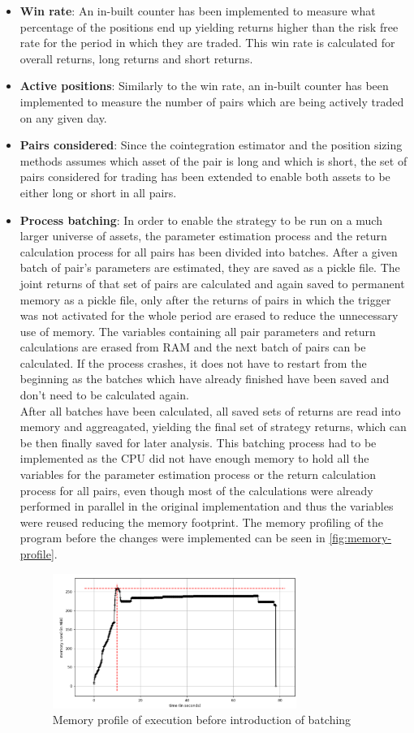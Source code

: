 \begin{itemize}
    \item \textbf{Win rate}: An in-built counter has been implemented to measure what percentage of the positions end up yielding returns higher than the risk free rate for the period in which they are traded. This win rate is calculated for overall returns, long returns and short returns. 
    \item \textbf{Active positions}: Similarly to the win rate, an in-built counter has been implemented to measure the number of pairs which are being actively traded on any given day.  
    \item \textbf{Pairs considered}: Since the cointegration estimator and the position sizing methods assumes which asset of the pair is long and which is short, the set of pairs considered for trading has been extended to enable both assets to be either long or short in all pairs. 
    \item \textbf{Process batching}: In order to enable the strategy to be run on a much larger universe of assets, the parameter estimation process and the return calculation process for all pairs has been divided into batches. After a given batch of pair's parameters are estimated, they are saved as a pickle file. The joint returns of that set of pairs are calculated and again saved to permanent memory as a pickle file, only after the returns of pairs in which the trigger was not activated for the whole period are erased to reduce the unnecessary use of memory. The variables containing all pair parameters and return calculations are erased from RAM and the next batch of pairs can be calculated. If the process crashes, it does not have to restart from the beginning as the batches which have already finished have been saved and don't need to be calculated again. 
    \\After all batches have been calculated, all saved sets of returns are read into memory and aggreagated, yielding the final set of strategy returns, which can be then finally saved for later analysis. This batching process had to be implemented as the CPU did not have enough memory to hold all the variables for the parameter estimation process or the return calculation process for all pairs, even though most of the calculations were already performed in parallel in the original implementation and thus the variables were reused reducing the memory footprint. The memory profiling of the program before the changes were implemented can be seen in \autoref{fig:memory-profile}.
    \newpage
    \begin{figure}[h]
        \centering
        \includegraphics[width=300px]{assets/memory-profile.png}
        \caption{Memory profile of execution before introduction of batching}
        \label{fig:memory-profile}
    \end{figure}
    

\end{itemize}
